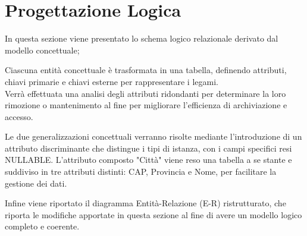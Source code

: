 \documentclass[10pt,twoside]{article}
\begin{document}
\section{Progettazione Logica}{
    In questa sezione viene presentato lo schema logico relazionale derivato dal modello concettuale;
    
    Ciascuna entità concettuale è trasformata in una tabella, definendo attributi, chiavi primarie e chiavi esterne per rappresentare i legami. \\
    Verrà effettuata una analisi degli attributi ridondanti per determinare la loro rimozione o mantenimento al fine per migliorare l’efficienza di archiviazione e accesso.
    
    Le due generalizzazioni concettuali verranno risolte mediante l’introduzione di un attributo discriminante che distingue i tipi di istanza, con i campi specifici resi NULLABLE.
    L'attributo composto "Città" viene reso una tabella a se stante e suddiviso in tre attributi distinti: CAP, Provincia e Nome, per facilitare la gestione dei dati.

    Infine viene riportato il diagramma Entità-Relazione (E-R) ristrutturato, che riporta le modifiche apportate in questa sezione al fine di avere un modello logico completo e coerente.

}
\end{document}

